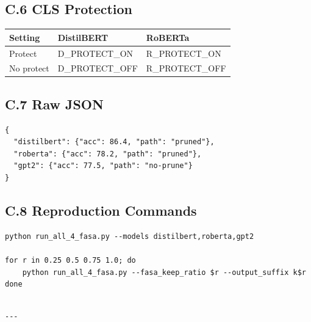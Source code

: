 \subsection{C.6 CLS Protection}

\begin{table}[H]
\centering
\small
\begin{tabular}{lll}
\toprule
\textbf{Setting} & \textbf{DistilBERT} & \textbf{RoBERTa} \\
\midrule
Protect & {{D\_PROTECT\_ON}} & {{R\_PROTECT\_ON}} \\
No protect & {{D\_PROTECT\_OFF}} & {{R\_PROTECT\_OFF}} \\
\bottomrule
\end{tabular}
\end{table}

\subsection{C.7 Raw JSON}

\begin{lstlisting}
{
  "distilbert": {"acc": 86.4, "path": "pruned"},
  "roberta": {"acc": 78.2, "path": "pruned"},
  "gpt2": {"acc": 77.5, "path": "no-prune"}
}
\end{lstlisting}

\subsection{C.8 Reproduction Commands}

\begin{lstlisting}
python run_all_4_fasa.py --models distilbert,roberta,gpt2

for r in 0.25 0.5 0.75 1.0; do
    python run_all_4_fasa.py --fasa_keep_ratio $r --output_suffix k$r
done
\end{lstlisting}
\begin{lstlisting}

---
\end{lstlisting}